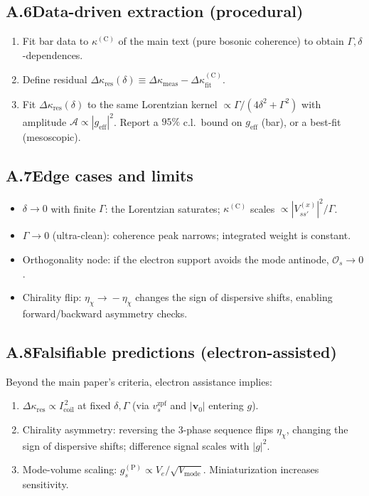 \documentclass[aps,prb,preprint,amsmath,amssymb]{revtex4-2} %
\begin{document}
    \subsection*{A.6\quad Data-driven extraction (procedural)}
        \begin{enumerate}\itemsep2pt
            \item Fit bar data to \(\kappa^{(\mathrm C)}\) of the main text (pure bosonic coherence) to obtain \(\Gamma,\delta\)-dependences.
            \item Define residual \(\Delta\kappa_\textrm{res}(\delta)\equiv \Delta\kappa_\textrm{meas}-\Delta\kappa^{(\mathrm C)}_\textrm{fit}\).
            \item Fit \(\Delta\kappa_\textrm{res}(\delta)\) to the same Lorentzian kernel \(\propto \Gamma/(4\delta^2+\Gamma^2)\) with amplitude \(\mathcal A\propto |g_\textrm{eff}|^2\). Report a \(95\%\) c.l.\ bound on \(g_\textrm{eff}\) (bar), or a best-fit (mesoscopic).
        \end{enumerate}

    \subsection*{A.7\quad Edge cases and limits}
        \begin{itemize}\itemsep2pt
            \item \(\delta\!\to\!0\) with finite \(\Gamma\): the Lorentzian saturates; \(\kappa^{(\mathrm C)}\) scales \(\propto |V_{ss'}^{(x)}|^2/\Gamma\).
            \item \(\Gamma\!\to\!0\) (ultra-clean): coherence peak narrows; integrated weight is constant.
            \item Orthogonality node: if the electron support avoids the mode antinode, \(\mathcal O_s\!\to\!0\).
            \item Chirality flip: \(\eta_\chi\!\to\!-\eta_\chi\) changes the sign of dispersive shifts, enabling forward/backward asymmetry checks.
        \end{itemize}

    \subsection*{A.8\quad Falsifiable predictions (electron-assisted)}
        Beyond the main paper’s criteria, electron assistance implies:
        \begin{enumerate}\itemsep2pt
            \item \(\Delta\kappa_\textrm{res}\propto I_\textrm{coil}^{\,2}\) at fixed \(\delta,\Gamma\) (via \(v_{s}^\textrm{zpf}\) and \(|\mathbf v_0|\) entering \(g\)).
            \item Chirality asymmetry: reversing the 3-phase sequence flips \(\eta_\chi\), changing the sign of dispersive shifts; difference signal scales with \(|g|^2\).
            \item Mode-volume scaling: \(g_s^{(\mathrm P)}\propto V_e/\sqrt{V_\textrm{mode}}\). Miniaturization increases sensitivity.
        \end{enumerate}
\end{document}
